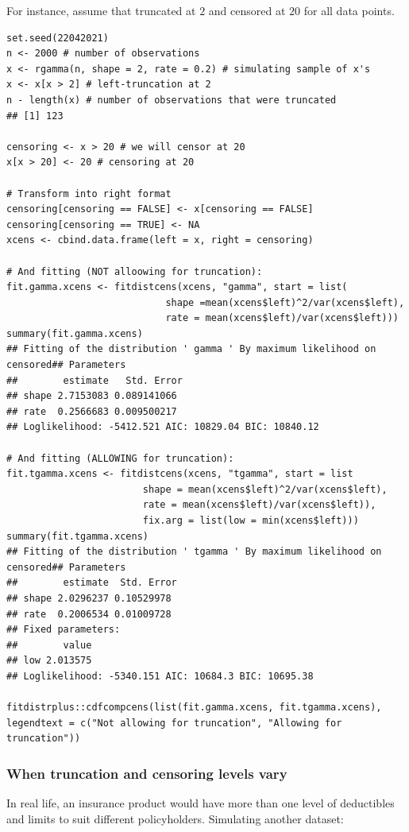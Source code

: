 \documentclass[11pt]{article}
\newcommand{\noi}{\noindent}
\begin{document}
\noi For instance, assume that truncated at $2$ and censored at $20$ for all data points.

\begin{lstlisting}
set.seed(22042021)
n <- 2000 # number of observations
x <- rgamma(n, shape = 2, rate = 0.2) # simulating sample of x's
x <- x[x > 2] # left-truncation at 2
n - length(x) # number of observations that were truncated
## [1] 123

censoring <- x > 20 # we will censor at 20
x[x > 20] <- 20 # censoring at 20

# Transform into right format
censoring[censoring == FALSE] <- x[censoring == FALSE]
censoring[censoring == TRUE] <- NA
xcens <- cbind.data.frame(left = x, right = censoring)

# And fitting (NOT alloowing for truncation):
fit.gamma.xcens <- fitdistcens(xcens, "gamma", start = list(
                            shape =mean(xcens$left)^2/var(xcens$left),
                            rate = mean(xcens$left)/var(xcens$left)))
summary(fit.gamma.xcens)
## Fitting of the distribution ' gamma ' By maximum likelihood on censored## Parameters
##        estimate   Std. Error
## shape 2.7153083 0.089141066
## rate  0.2566683 0.009500217
## Loglikelihood: -5412.521 AIC: 10829.04 BIC: 10840.12

# And fitting (ALLOWING for truncation):
fit.tgamma.xcens <- fitdistcens(xcens, "tgamma", start = list
                        shape = mean(xcens$left)^2/var(xcens$left),
                        rate = mean(xcens$left)/var(xcens$left)),
                        fix.arg = list(low = min(xcens$left)))
summary(fit.tgamma.xcens)
## Fitting of the distribution ' tgamma ' By maximum likelihood on censored## Parameters
##        estimate  Std. Error
## shape 2.0296237 0.10529978
## rate  0.2006534 0.01009728
## Fixed parameters:
##        value
## low 2.013575
## Loglikelihood: -5340.151 AIC: 10684.3 BIC: 10695.38

fitdistrplus::cdfcompcens(list(fit.gamma.xcens, fit.tgamma.xcens),
legendtext = c("Not allowing for truncation", "Allowing for truncation"))
\end{lstlisting}

\subsubsection{When truncation and censoring levels vary}
\noi In real life, an insurance product would have more than one level of
deductibles and limits to suit different policyholders. Simulating another
dataset:
\end{document}
